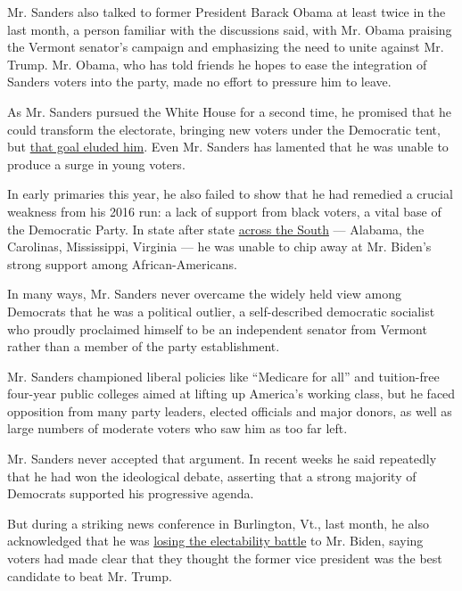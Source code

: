 Mr. Sanders also talked to former President Barack Obama at least twice
in the last month, a person familiar with the discussions said, with Mr.
Obama praising the Vermont senator's campaign and emphasizing the need
to unite against Mr. Trump. Mr. Obama, who has told friends he hopes to
ease the integration of Sanders voters into the party, made no effort to
pressure him to leave.

As Mr. Sanders pursued the White House for a second time, he promised
that he could transform the electorate, bringing new voters under the
Democratic tent, but
\href{https://www.nytimes3xbfgragh.onion/2020/02/24/us/politics/bernie-sanders-democratic-voters.html}{that
goal eluded him}. Even Mr. Sanders has lamented that he was unable to
produce a surge in young voters.

In early primaries this year, he also failed to show that he had
remedied a crucial weakness from his 2016 run: a lack of support from
black voters, a vital base of the Democratic Party. In state after state
\href{https://www.nytimes3xbfgragh.onion/2020/03/04/us/politics/super-tuesday-virginia-voter-turnout.html}{across
the South} --- Alabama, the Carolinas, Mississippi, Virginia --- he was
unable to chip away at Mr. Biden's strong support among
African-Americans.

In many ways, Mr. Sanders never overcame the widely held view among
Democrats that he was a political outlier, a self-described democratic
socialist who proudly proclaimed himself to be an independent senator
from Vermont rather than a member of the party establishment.

Mr. Sanders championed liberal policies like ``Medicare for all'' and
tuition-free four-year public colleges aimed at lifting up America's
working class, but he faced opposition from many party leaders, elected
officials and major donors, as well as large numbers of moderate voters
who saw him as too far left.

Mr. Sanders never accepted that argument. In recent weeks he said
repeatedly that he had won the ideological debate, asserting that a
strong majority of Democrats supported his progressive agenda.

But during a striking news conference in Burlington, Vt., last month, he
also acknowledged that he was
\href{https://www.nytimes3xbfgragh.onion/2020/03/11/us/politics/bernie-sanders-democrats-2020.html}{losing
the electability battle} to Mr. Biden, saying voters had made clear that
they thought the former vice president was the best candidate to beat
Mr. Trump.

